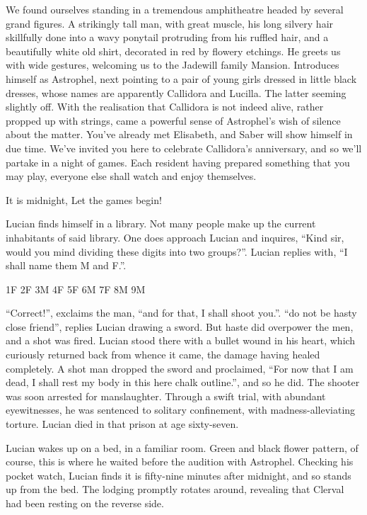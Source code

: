 We found ourselves standing in a tremendous amphitheatre headed by
several grand figures. A strikingly tall man, with great muscle, his
long silvery hair skillfully done into a wavy ponytail protruding from
his ruffled hair, and a beautifully white old shirt, decorated in red by
flowery etchings. He greets us with wide gestures, welcoming us to the
Jadewill family Mansion. Introduces himself as Astrophel, next pointing
to a pair of young girls dressed in little black dresses, whose names
are apparently Callidora and Lucilla. The latter seeming slightly off.
With the realisation that Callidora is not indeed alive, rather propped
up with strings, came a powerful sense of Astrophel's wish of silence
about the matter. You've already met Elisabeth, and Saber will show
himself in due time. We've invited you here to celebrate Callidora's
anniversary, and so we'll partake in a night of games. Each resident
having prepared something that you may play, everyone else shall watch
and enjoy themselves.

It is midnight, Let the games begin!

Lucian finds himself in a library. Not many people make up the current
inhabitants of said library. One does approach Lucian and inquires,
``Kind sir, would you mind dividing these digits into two groups?''.
Lucian replies with, ``I shall name them M and F.''.

1F
2F
3M
4F
5F
6M
7F
8M
9M

``Correct!'', exclaims the man, ``and for that, I shall shoot you.''.
``do not be hasty close friend'', replies Lucian drawing a sword. But
haste did overpower the men, and a shot was fired. Lucian stood there
with a bullet wound in his heart, which curiously returned back from
whence it came, the damage having healed completely. A shot man dropped
the sword and proclaimed, ``For now that I am dead, I shall rest my body
in this here chalk outline.'', and so he did. The shooter was soon
arrested for manslaughter. Through a swift trial, with abundant
eyewitnesses, he was sentenced to solitary confinement, with
madness-alleviating torture. Lucian died in that prison at age
sixty-seven.

Lucian wakes up on a bed, in a familiar room. Green and black flower
pattern, of course, this is where he waited before the audition with
Astrophel. Checking his pocket watch, Lucian finds it is fifty-nine
minutes after midnight, and so stands up from the bed. The lodging
promptly rotates around, revealing that Clerval had been resting on the
reverse side.

